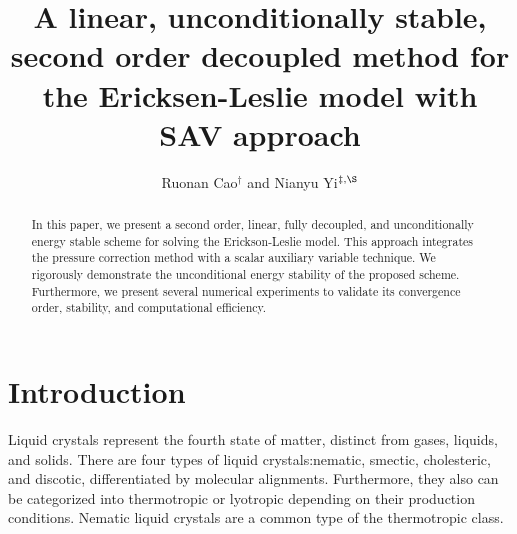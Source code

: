 \documentclass[12pt,reqno]{amsart}
\numberwithin{equation}{section}
\begin{document}
\title[PCSAV method for the Ericksen-Leslie model]{A linear, unconditionally stable, second order decoupled method for the Ericksen-Leslie model with SAV approach}

\author[R. Cao and N. Yi]{Ruonan Cao$^\dagger$ and Nianyu Yi$^{\ddagger,\S}$}
\address{$^\dagger$ School of Mathematics and Computational Science, Xiangtan University, Xiangtan 411105, P.R.China }
\address{$^\ddagger$ Hunan Key Laboratory for Computation and Simulation in Science and Engineering; School of Mathematics and Computational Science, Xiangtan University, Xiangtan 411105, P.R.China}


\subjclass{}



\begin{abstract}
In this paper, we present a second order, linear, fully decoupled, and unconditionally energy stable scheme for solving the Erickson-Leslie model.
This approach integrates the pressure correction method with a scalar auxiliary variable technique. We rigorously demonstrate the unconditional energy stability of the proposed scheme.
Furthermore, we present several numerical experiments to validate its convergence order, stability, and computational efficiency. 
\end{abstract}


\maketitle


\section{Introduction}
Liquid crystals represent the fourth state of matter, distinct from gases, liquids, and solids. 
There are four types of liquid crystals:nematic, smectic, cholesteric, and discotic, differentiated by molecular alignments.
Furthermore, they also can be categorized into thermotropic or lyotropic depending on their production conditions. Nematic liquid crystals are a common type of the thermotropic class.
\end{document}

